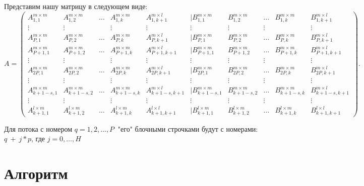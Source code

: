 \documentclass[a4paper,12pt]{article}
\begin{document}
Представим нашу матрицу в следующем виде:
\begin{equation*}
A = 
\begin{pmatrix}
A_{1,1}^{m \times m} & A_{1,2}^{m \times m} & \dots & A_{1,k}^{m \times m} & A_{1,k+1}^{m \times l} & | B_{1,1}^{m \times m} & B_{1,2}^{m \times m} & \dots & B_{1,k}^{m\times m} & B_{1,k+1}^{m \times l}\\
\vdots & \vdots &  & \vdots & \vdots &\vdots  &\vdots   &\vdots  & \  &\vdots \\
A_{P,1}^{m \times m} & A_{P,2}^{m \times m} & \dots & A_{P,k}^{m \times m} & A_{P,k+1}^{m \times l}& | B_{P,1}^{m \times m} & B_{P,2}^{m \times m} & \dots & B_{P,k}^{m\times m} & B_{P,k+1}^{m \times l}\\
\hline
A_{P+1,1}^{m \times m} & A_{P+1,2}^{m \times m} & \dots & A_{P+1,k}^{m \times m} & A_{P+1,k+1}^{m \times l} & | B_{P+1,1}^{m \times m} & B_{P+1,2}^{m \times m} & \dots & B_{P+1,k}^{m\times m} & B_{P+1,k+1}^{m \times l}\\
\vdots & \vdots &  & \vdots & \vdots &\vdots  &\vdots   &\vdots  & \  &\vdots \\A_{2P,1}^{m \times m} & A_{2P,2}^{m \times m} & \dots & A_{2P,k}^{m \times m} & A_{2P,k+1}^{m \times l} & | B_{2P,1}^{m \times m} & B_{2P,2}^{m \times m} & \dots & B_{2P,k}^{m\times m} & B_{2P,k+1}^{m \times l}\\
\hline
\vdots & \vdots &  & \vdots & \vdots &\vdots  &\vdots   &\vdots  & \  &\vdots \\\hline
A_{k+1-s,1}^{m \times m} & A_{k+1-s,2}^{m \times m} & \dots & A_{k+1-s,k}^{m \times m} & A_{k+1-s,k+1}^{m \times l} & | B_{k+1-s,1}^{m \times m} & B_{k+1-s,2}^{m \times m} & \dots & B_{k+1-s,k}^{m\times m} & B_{k+1-s,k+1}^{m \times l}\\
\vdots & \vdots &  & \vdots & \vdots &\vdots  &\vdots   &\vdots  & \  &\vdots \\
A_{k+1,1}^{l \times m} & A_{k+1,2}^{l \times m} & \dots & A_{k+1,k}^{l \times m} & A_{k+1,k+1}^{l \times l} & | B_{k+1,1}^{l \times m} & B_{k+1,2}^{l \times m} & \dots & B_{k+1,k}^{l\times m} & B_{k+1,k+1}^{l \times l}
\end{pmatrix}.
\end{equation*}

Для потока с номером $q = 1, 2, \dots , P \ $ "его" блочными строчками будут с номерами:$q \ + \ j*p$, где $j = 0, \dots ,H$

\section{Алгоритм}
\end{document}
